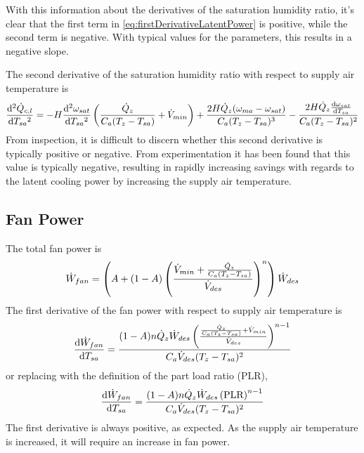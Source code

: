 With this information about the derivatives of the saturation humidity
ratio, it's clear that the first term in 
\ref{eq:firstDerivativeLatentPower} is positive, while the second term
is negative. With typical values for the parameters, this results in a
negative slope. 

The second derivative of the saturation humidity ratio with respect to
supply air temperature is
\begin{equation}
    \dv[2]{\dot{Q}_{c,l}}{T_{sa}{}}  =  -H \dv[2]{\omega_{sat}}{T_{sa}{}} \left(\frac{\dot{Q}_{z}}{C_{a}
            (T_{z}-T_{sa}{})}+\dot{V}_{min}\right)+\frac{2 H
            \dot{Q}_{z} (\omega_{ma}-\omega_{sat})}{C_{a}
            (T_{z}-T_{sa}{})^3}-\frac{2 H \dot{Q}_{z}
        \dv{\omega_{sat}}{T_{sa}{}}}{C_{a} (T_{z}-T_{sa}{})^2}
\end{equation}
From inspection, it is difficult to discern whether this second
derivative is typically positive or negative. From experimentation it
has been found that this value is typically negative, resulting in
rapidly increasing savings with regards to the latent cooling power by
increasing the supply air temperature. 

\subsection{Fan Power}

The total fan power is
\begin{equation}\label{eq:fanPowerForDerivative}
    \dot{W}_{fan} = \left(A + \left(1-A\right)\left(\frac{\dot{V}_{min} + \frac{\dot{Q}_{z}}{C_{a}\left(T_{z}-T_{sa}{}\right)}{}}{\dot{V}_{des}}\right)^{n}\right) \dot{W}_{des}
\end{equation}
The first derivative of the fan power with respect to supply air
temperature is
\begin{equation}
    \dv{\dot{W}_{fan}}{T_{sa}{}} =\frac{(1-A) n \dot{Q}_{z} \dot{W}_{des}
    \left(\frac{\frac{\dot{Q}_{z}}{C_{a}
(T_{z}-T_{sa}{})}+\dot{V}_{min}}{\dot{V}_{des}}\right)^{n-1}}{C_{a} \dot{V}_{des}
(T_{z}-T_{sa}{})^2} 
\end{equation}
or replacing with the definition of the part load ratio (PLR),
\begin{equation}
    \dv{\dot{W}_{fan}}{T_{sa}{}} =\frac{(1-A) n \dot{Q}_{z} \dot{W}_{des}
    \left( \text{PLR} \right)^{n-1}}{C_{a} \dot{V}_{des}
(T_{z}-T_{sa}{})^2} 
\end{equation}
The first derivative is always positive, as expected. As the supply air
temperature is increased, it will require an increase in fan power.


